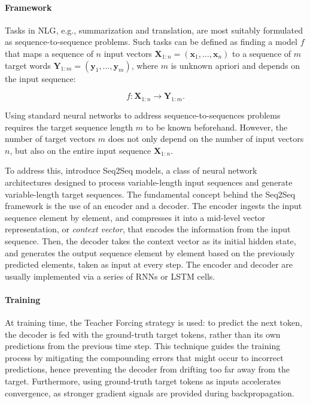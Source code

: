 \paragraph{Framework} Tasks in \ac{NLG}, e.g., summarization and translation, are most suitably formulated as sequence-to-sequence problems. Such tasks can be defined as finding a model $f$ that maps a sequence of $n$ input vectors $\bm{X}_{1:n} = (\bm{x}_1, \ldots, \bm{x}_n)$ to a sequence of $m$ target words $\bm{Y}_{1:m} = (\bm{y}_1, \ldots, \bm{y}_m)$, where $m$ is unknown apriori and depends on the input sequence:

\begin{equation}
    f : \bm{X}_{1:n} \rightarrow \bm{Y}_{1:m}.
\end{equation}

Using standard neural networks to address sequence-to-sequences problems requires the target sequence length $m$ to be known beforehand. However, the number of target vectors $m$ does not only depend on the number of input vectors $n$, but also on the entire input sequence $\bm{X}_{1:n}$. 

To address this, \citet{sutskever2014sequence} introduce \ac{Seq2Seq} models, a class of neural network architectures designed to process variable-length input sequences and generate variable-length target sequences. The fundamental concept behind the \ac{Seq2Seq} framework is the use of an encoder and a decoder. The encoder ingests the input sequence element by element, and compresses it into a mid-level vector representation, or \textit{context vector}, that encodes the information from the input sequence. Then, the decoder takes the context vector as its initial hidden state, and generates the output sequence element by element based on the previously predicted elements, taken as input at every step. The encoder and decoder are usually implemented via a series of \acp{RNN} or \ac{LSTM} cells. 

\paragraph{Training} At training time, the Teacher Forcing strategy is used: to predict the next token, the decoder is fed with the ground-truth target tokens, rather than its own predictions from the previous time step. This technique guides the training process by mitigating the compounding errors that might occur to incorrect predictions, hence preventing the decoder from drifting too far away from the target. Furthermore, using ground-truth target tokens as inputs accelerates convergence, as stronger gradient signals are provided during backpropagation. 

